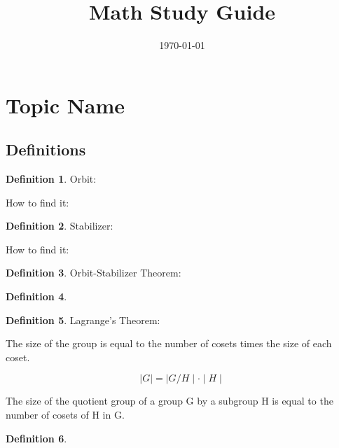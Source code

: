 \documentclass[11pt]{article}
\title{Math Study Guide}
\author{}
\date{\today}
\theoremstyle{definition}
\newtheorem{definition}{Definition}[section]
\theoremstyle{plain}
\theoremstyle{remark}
\begin{document}
\maketitle
\tableofcontents
\newpage

\section{Topic Name}

\subsection{Definitions}

\begin{definition}


Orbit: 

How to find it:

\end{definition}

\begin{definition}

Stabilizer:

How to find it:

\end{definition}

\begin{definition}

Orbit-Stabilizer Theorem:

\end{definition}


\begin{definition}



\end{definition}

\begin{definition}

Lagrange's Theorem:

The size of the group is equal to the number of cosets times the size of each coset.

$$
\mid G \mid = \mid G/H \mid \cdot \mid H \mid
$$

The size of the quotient group of a group G by a subgroup H is equal to the number of cosets of H in G.

\end{definition}

\begin{definition}



\end{definition}
\end{document}
